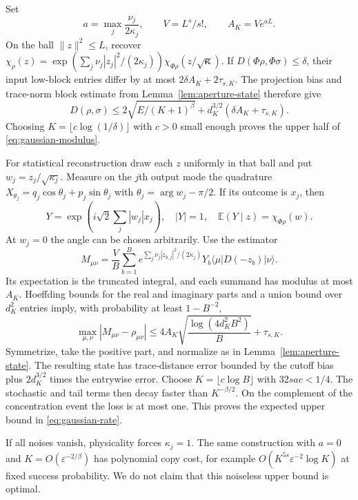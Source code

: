 Set
\[
 a=\max_j\frac{\nu_j}{2\kappa_j},\qquad V=L^s/s!,\qquad A_K=Ve^{aL}.
\]
On the ball $\|z\|^2\le L$, recover
$\chi_\rho(z)=\exp(\sum_j\nu_j|z_j|^2/(2\kappa_j))
\chi_{\Phi\rho}(z/\sqrt{\boldsymbol\kappa})$.
If $D(\Phi\rho,\Phi\sigma)\le\delta$, their input low-block entries differ
by at most $2\delta A_K+2\tau_{s,K}$. The projection bias and trace-norm
block estimate from Lemma~\ref{lem:aperture-state} therefore give
\[
 D(\rho,\sigma)\le2\sqrt{E/(K+1)^\beta}
           +d_K^{3/2}(\delta A_K+\tau_{s,K}).
 \tag{D.8}\label{eq:gaussian-stability-upper}
\]
Choosing $K=\lfloor c\log(1/\delta)\rfloor$ with $c>0$ small enough
proves the upper half of \eqref{eq:gaussian-modulus}.

For statistical reconstruction draw each $z$ uniformly in that ball and put
$w_j=z_j/\sqrt{\kappa_j}$. Measure on the $j$th output mode the quadrature
$X_{\theta_j}=q_j\cos\theta_j+p_j\sin\theta_j$ with
$\theta_j=\arg w_j-\pi/2$. If its outcome is $x_j$, then
\[
 Y=\exp\!\left(i\sqrt2\sum_j|w_j|x_j\right),
 \quad |Y|=1,\quad \mathbb E(Y\mid z)=\chi_{\Phi\rho}(w).
\]
At $w_j=0$ the angle can be chosen arbitrarily. Use the estimator
\[
 M_{\mu\nu}=\frac V B\sum_{b=1}^B
 e^{\sum_j\nu_j|z_{b,j}|^2/(2\kappa_j)}Y_b
                   \langle\mu|D(-z_b)|\nu\rangle.
 \tag{D.9}\label{eq:gaussian-homodyne-estimator}
\]
Its expectation is the truncated integral, and each summand has modulus at
most $A_K$. Hoeffding bounds for the real and imaginary parts and a union
bound over $d_K^2$ entries imply, with probability at least $1-B^{-2}$,
\[
 \max_{\mu,\nu}|M_{\mu\nu}-\rho_{\mu\nu}|
 \le4A_K\sqrt{\frac{\log(4d_K^2B^2)}B}+\tau_{s,K}.
 \tag{D.10}\label{eq:gaussian-statistical-error}
\]
Symmetrize, take the positive part, and normalize as in
Lemma~\ref{lem:aperture-state}. The resulting state has trace-distance
error bounded by the cutoff bias plus $2d_K^{3/2}$ times the entrywise
error. Choose $K=\lfloor c\log B\rfloor$ with $32sac<1/4$.
The stochastic and tail terms then decay faster than $K^{-\beta/2}$.
On the complement of the concentration event the loss is at most one.
This proves the expected upper bound in \eqref{eq:gaussian-rate}.

If all noises vanish, physicality forces $\kappa_j=1$. The same construction
with $a=0$ and $K=O(\varepsilon^{-2/\beta})$ has polynomial copy cost,
for example $O(K^{5s}\varepsilon^{-2}\log K)$ at fixed success probability.
We do not claim that this noiseless upper bound is optimal.

